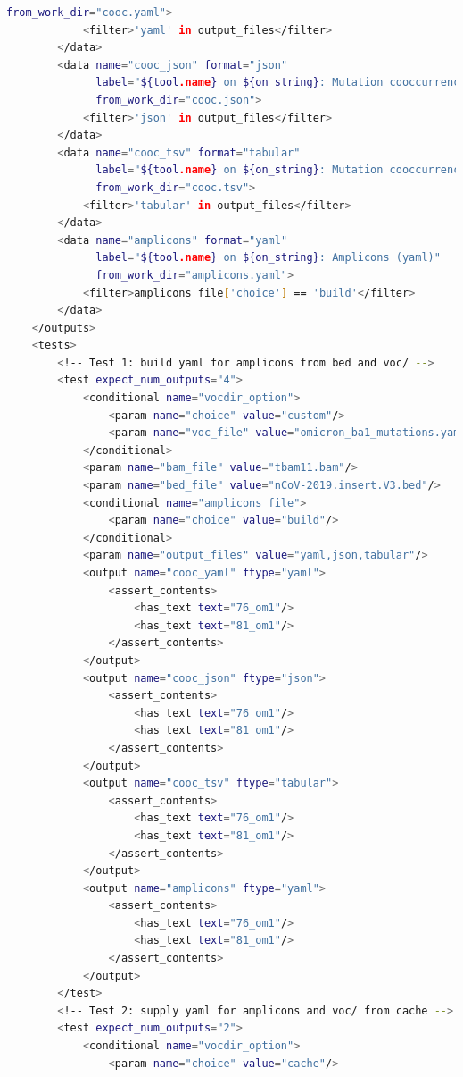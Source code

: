 \begin{lstlisting}[language=bash, caption=tool wrapper for Cojac: mutbamscan, label=list:methods:wrapper-cojac-mutbamcsan]
              from_work_dir="cooc.yaml">
            <filter>'yaml' in output_files</filter>
        </data>
        <data name="cooc_json" format="json"
              label="${tool.name} on ${on_string}: Mutation cooccurrence (json)"
              from_work_dir="cooc.json">
            <filter>'json' in output_files</filter>
        </data>
        <data name="cooc_tsv" format="tabular"
              label="${tool.name} on ${on_string}: Mutation cooccurrence (tabular)"
              from_work_dir="cooc.tsv">
            <filter>'tabular' in output_files</filter>
        </data>
        <data name="amplicons" format="yaml"
              label="${tool.name} on ${on_string}: Amplicons (yaml)"
              from_work_dir="amplicons.yaml">
            <filter>amplicons_file['choice'] == 'build'</filter>
        </data>
    </outputs>
    <tests>
        <!-- Test 1: build yaml for amplicons from bed and voc/ -->
        <test expect_num_outputs="4">
            <conditional name="vocdir_option">
                <param name="choice" value="custom"/>
                <param name="voc_file" value="omicron_ba1_mutations.yaml"/>
            </conditional>
            <param name="bam_file" value="tbam11.bam"/>
            <param name="bed_file" value="nCoV-2019.insert.V3.bed"/>
            <conditional name="amplicons_file">
                <param name="choice" value="build"/>
            </conditional>
            <param name="output_files" value="yaml,json,tabular"/>
            <output name="cooc_yaml" ftype="yaml">
                <assert_contents>
                    <has_text text="76_om1"/>
                    <has_text text="81_om1"/>
                </assert_contents>
            </output>
            <output name="cooc_json" ftype="json">
                <assert_contents>
                    <has_text text="76_om1"/>
                    <has_text text="81_om1"/>
                </assert_contents>
            </output>
            <output name="cooc_tsv" ftype="tabular">
                <assert_contents>
                    <has_text text="76_om1"/>
                    <has_text text="81_om1"/>
                </assert_contents>
            </output>
            <output name="amplicons" ftype="yaml">
                <assert_contents>
                    <has_text text="76_om1"/>
                    <has_text text="81_om1"/>
                </assert_contents>
            </output>
        </test>
        <!-- Test 2: supply yaml for amplicons and voc/ from cache -->
        <test expect_num_outputs="2">
            <conditional name="vocdir_option">
                <param name="choice" value="cache"/>

\end{lstlisting}
